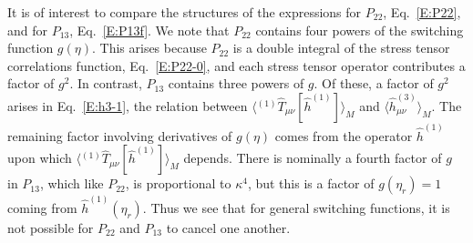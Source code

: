 \documentclass[preprint,prd,showpacs,superscriptaddress]{revtex4}
\begin{document}
It is of interest to compare the structures of the expressions for $P_{22}$, Eq.~\eqref{E:P22}, and for $P_{13}$, Eq.~\eqref{E:P13f}.
We note that $P_{22}$ contains four powers of the switching function $g(\eta)$. This arises because $P_{22}$ is a double integral of the
stress tensor correlations function, Eq.~\eqref{E:P22-0}, and each stress tensor operator contributes a factor of $g^2$. In contrast,
$P_{13}$ contains three powers of $g$. Of these, a factor of  $g^2$ arises in Eq.~\eqref{E:h3-1}, the relation between 
$ \langle{}^{(1)}\hat{T}_{\mu\nu}[\hat{h}^{(1)}] \rangle_M$ and $\langle \hat{h}^{(3)}_{\mu\nu} \rangle_M$. The remaining factor involving
derivatives of $g(\eta)$ comes from the operator $\hat{h}^{(1)}$ upon which $\langle {}^{(1)}\hat{T}_{\mu\nu}[\hat{h}^{(1)}] \rangle_M$ depends.
There is nominally a fourth factor of $g$ in $P_{13}$, which like $P_{22}$, is proportional to $\kappa^4$, but this is a factor of
$g(\eta_r)=1$ coming from $\hat{h}^{(1)}(\eta_r)$. Thus we see that for general switching functions, it is not possible for $P_{22}$
and $P_{13}$ to cancel one another.
\end{document}
